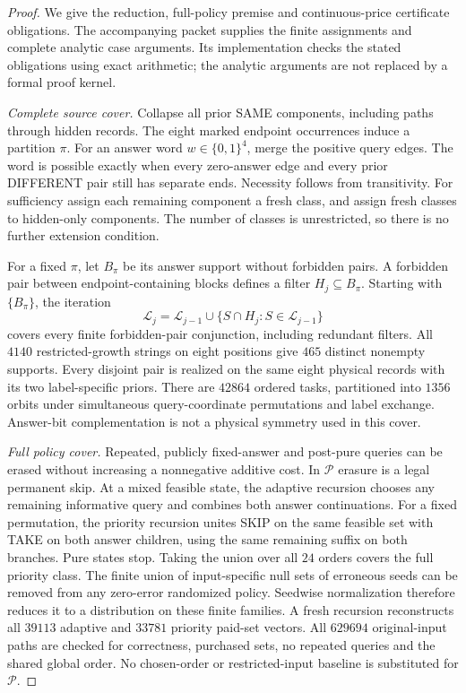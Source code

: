 \begin{proof}
We give the reduction, full-policy premise and continuous-price
certificate obligations. The accompanying packet supplies the finite
assignments and complete analytic case arguments. Its implementation
checks the stated obligations using exact arithmetic; the analytic
arguments are not replaced by a formal proof kernel.

\emph{Complete source cover.}
Collapse all prior SAME components, including paths through hidden
records. The eight marked endpoint occurrences induce a partition $\pi$.
For an answer word $w\in\{0,1\}^4$, merge the positive query edges.
The word is possible exactly when every zero-answer edge and every
prior DIFFERENT pair still has separate ends. Necessity follows from
transitivity. For sufficiency assign each remaining component a fresh
class, and assign fresh classes to hidden-only components. The number
of classes is unrestricted, so there is no further extension condition.

For a fixed $\pi$, let $B_\pi$ be its answer support without forbidden
pairs. A forbidden pair between endpoint-containing blocks defines a
filter $H_j\subseteq B_\pi$. Starting with $\{B_\pi\}$, the iteration
\[
 \mathcal L_j=\mathcal L_{j-1}\cup
       \{S\cap H_j:S\in\mathcal L_{j-1}\}
\]
covers every finite forbidden-pair conjunction, including redundant
filters. All $4140$ restricted-growth strings on eight positions give
$465$ distinct nonempty supports. Every disjoint pair is realized on
the same eight physical records with its two label-specific priors.
There are $42864$ ordered tasks, partitioned into $1356$ orbits under
simultaneous query-coordinate permutations and label exchange.
Answer-bit complementation is not a physical symmetry used in this cover.

\emph{Full policy cover.}
Repeated, publicly fixed-answer and post-pure queries can be erased
without increasing a nonnegative additive cost. In $\mathcal P$ erasure
is a legal permanent skip. At a mixed feasible state, the adaptive
recursion chooses any remaining informative query and combines both
answer continuations. For a fixed permutation, the priority recursion
unites SKIP on the same feasible set with TAKE on both answer children,
using the same remaining suffix on both branches. Pure states stop.
Taking the union over all $24$ orders covers the full priority class.
The finite union of input-specific null sets of erroneous seeds can
be removed from any zero-error randomized policy. Seedwise
normalization therefore reduces it to a distribution on these finite
families. A fresh recursion reconstructs all $39113$ adaptive and
$33781$ priority paid-set vectors. All $629694$ original-input paths
are checked for correctness, purchased sets, no repeated queries and
the shared global order. No chosen-order or restricted-input baseline
is substituted for $\mathcal P$.


\end{proof}
